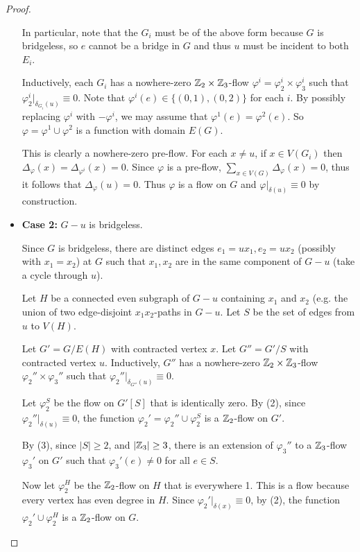 \documentclass[main.tex]{subfiles}
\begin{document}
\begin{proof}
\begin{itemize}
      In particular, note that the $G_i$ must be of the above form because $G$
      is bridgeless, so $e$ cannot be a bridge in $G$ and thus $u$ must be
      incident to both $E_i$.

      Inductively, each $G_i$ has a nowhere-zero $\mathbb Z_2\times\mathbb Z_3$-flow
      $\varphi^i = \varphi^i_2\times\varphi^i_3$ such that
      $\varphi_2^i|_{\delta_{G_i}(u)}\equiv 0$.
      Note that $\varphi^i(e)\in\{(0,1),(0,2)\}$ for each $i$.
      By possibly replacing $\varphi^i$ with $-\varphi^i$, we may assume that
      $\varphi^1(e) = \varphi^2(e)$.
      So $\varphi = \varphi^1\cup\varphi^2$ is a function with domain $E(G)$.

      This is clearly a nowhere-zero pre-flow.
      For each $x\neq u$, if $x\in V(G_i)$ then
      $\Delta_\varphi(x) = \Delta_{\varphi^i}(x) = 0$.
      Since $\varphi$ is a pre-flow, $\sum_{x\in V(G)}\Delta_\varphi(x) = 0$,
      thus it follows that $\Delta_{\varphi}(u) = 0$.
      Thus $\varphi$ is a flow on $G$ and
      $\varphi|_{\delta(u)}\equiv 0$ by construction.

    \item \textbf{Case 2:} $G - u$ is bridgeless.

      Since $G$ is bridgeless, there are distinct edges $e_1 = ux_1, e_2 = ux_2$
      (possibly with $x_1 = x_2$) at $G$ such that $x_1,x_2$ are in the same
      component of $G - u$ (take a cycle through $u$).

      Let $H$ be a connected even subgraph of $G - u$ containing $x_1$ and $x_2$
      (e.g. the union of two edge-disjoint $x_1x_2$-paths in $G - u$.
      Let $S$ be the set of edges from $u$ to $V(H)$.

      Let $G' = G/E(H)$ with contracted vertex $x$.
      Let $G'' = G'/S$ with contracted vertex $u$.
      Inductively, $G''$ has a nowhere-zero $\mathbb Z_2\times\mathbb Z_3$-flow
      $\varphi_2''\times\varphi_3''$ such that
      $\varphi_2''|_{\delta_{G''}(u)}\equiv 0$.

      Let $\varphi_2^S$ be the flow on $G'[S]$ that is identically zero.
      By (2), since $\varphi_2''|_{\delta(u)}\equiv 0$, the function
      $\varphi_2' = \varphi_2''\cup\varphi_2^S$ is a $\mathbb Z_2$-flow on $G'$.

      By (3), since $|S|\geq 2$, and $|\mathbb Z_3|\geq 3$, there is an extension
      of $\varphi_3''$ to a $\mathbb Z_3$-flow $\varphi_3'$ on $G'$ such that
      $\varphi_3'(e)\neq 0$ for all $e\in S$.

      Now let $\varphi_2^H$ be the $\mathbb Z_2$-flow on $H$ that is everywhere 1.
      This is a flow because every vertex has even degree in $H$.
      Since $\varphi_2'|_{\delta(x)}\equiv 0$, by (2), the function
      $\varphi_2'\cup\varphi_2^H$ is a $\mathbb Z_2$-flow on $G$.


\end{itemize}
\end{proof}
\end{document}
